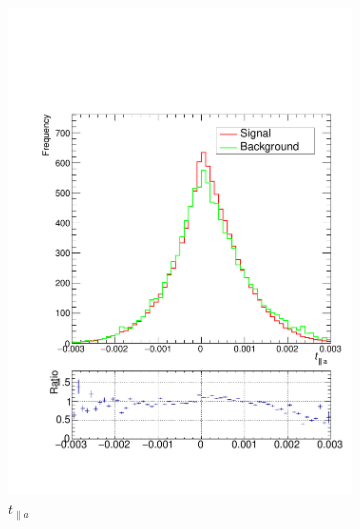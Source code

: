 \documentclass[10pt,a4paper]{book}
\begin{document}
\begin{figure}
\captionsetup[subfigure]{labelformat=empty}
\begin{subfigure}{.33\textwidth}
\centering
\includegraphics[scale=0.25]{reco/tpar1}
\caption{$t_{\parallel a}$}
\end{subfigure}
\begin{subfigure}{0.33\textwidth}
\centering

\end{subfigure}
\end{figure}
\end{document}
